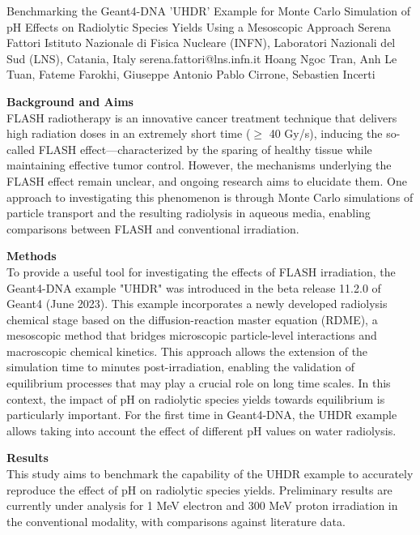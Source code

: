 \begin{talk}
\end{talk}

\begin{talk}
  {Benchmarking the Geant4-DNA 'UHDR' Example for Monte Carlo Simulation of pH Effects on Radiolytic Species Yields Using a Mesoscopic Approach}%
  {Serena Fattori}%
  {Istituto Nazionale di Fisica Nucleare (INFN), Laboratori Nazionali del Sud (LNS), Catania, Italy}%
  {serena.fattori@lns.infn.it}%
  {Hoang Ngoc Tran, Anh Le Tuan, Fateme Farokhi, Giuseppe Antonio Pablo Cirrone, Sebastien Incerti}%
  
    
   
\textbf{Background and Aims}\\
FLASH radiotherapy is an innovative cancer treatment technique that delivers high radiation doses in an extremely short time ($\geq$ 40 Gy/s), inducing the so-called FLASH effect—characterized by the sparing of healthy tissue while maintaining effective tumor control. However, the mechanisms underlying the FLASH effect remain unclear, and ongoing research aims to elucidate them. One approach to investigating this phenomenon is through Monte Carlo simulations of particle transport and the resulting radiolysis in aqueous media, enabling comparisons between FLASH and conventional irradiation.

\textbf{Methods}\\
To provide a useful tool for investigating the effects of FLASH irradiation, the Geant4-DNA example "UHDR" was introduced in the beta release 11.2.0 of Geant4 (June 2023). This example incorporates a newly developed radiolysis chemical stage based on the diffusion-reaction master equation (RDME), a mesoscopic method that bridges microscopic particle-level interactions and macroscopic chemical kinetics. This approach allows the extension of the simulation time to minutes post-irradiation, enabling the validation of equilibrium processes that may play a crucial role on long time scales. In this context, the impact of pH on radiolytic species yields towards equilibrium is particularly important. For the first time in Geant4-DNA, the UHDR example allows taking into account the effect of different pH values on water radiolysis.

\textbf{Results}\\
This study aims to benchmark the capability of the UHDR example to accurately reproduce the effect of pH on radiolytic species yields. Preliminary results are currently under analysis for 1 MeV electron and 300 MeV proton irradiation in the conventional modality, with comparisons against literature data.


\end{talk}
